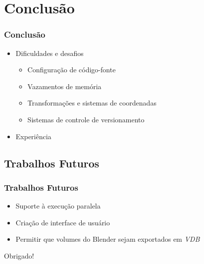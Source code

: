 \documentclass{beamer}
\begin{document}
\section{Conclusão}
\frametitle{Conclusão}
\begin{frame}
\begin{itemize}
\item Dificuldades e desafios
\begin{itemize}
\item Configuração de código-fonte
\item Vazamentos de memória
\item Transformações e sistemas de coordenadas
\item Sistemas de controle de versionamento  
\end{itemize}
\item Experiência
\end{itemize}


\end{frame}
\subsection{Trabalhos Futuros}
\begin{frame}

\frametitle{Trabalhos Futuros}

\begin{itemize}
\item Suporte à execução paralela
\item Criação de interface de usuário
\item Permitir que volumes do Blender sejam exportados em {\it VDB}
\end{itemize}

\end{frame}

\begin{frame}

\centerline{\Huge{Obrigado!}}
\end{frame}
\end{document}
